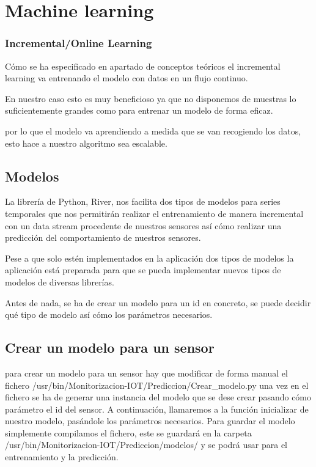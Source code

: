 \section{Machine learning}

\subsubsection{Incremental/Online Learning}

Cómo se ha especificado en apartado de conceptos teóricos el incremental learning va entrenando el modelo con datos en un flujo continuo. 

En nuestro caso esto es muy beneficioso ya que no disponemos de muestras lo suficientemente grandes como para entrenar un modelo de forma eficaz. 

por lo que el modelo va aprendiendo a medida que se van recogiendo los datos, esto hace a nuestro algoritmo sea escalable.

\subsection{Modelos}

La librería de Python, River, nos facilita dos tipos de modelos para series temporales que nos permitirán realizar el entrenamiento de manera incremental con un data stream procedente de nuestros sensores así cómo realizar una predicción del comportamiento de nuestros sensores.

Pese a que solo estén implementados en la aplicación dos tipos de modelos la aplicación está preparada para que se pueda implementar nuevos tipos de modelos de diversas librerías.

Antes de nada, se ha de crear un modelo para un id en concreto, se puede decidir qué tipo de modelo así cómo los parámetros necesarios.

\subsection{Crear un modelo para un sensor}

para crear un modelo para un sensor hay que modificar de forma manual el fichero /usr/bin/Monitorizacion-IOT/Prediccion/Crear\_modelo.py una vez en el fichero se ha de generar una instancia del modelo que se dese crear pasando cómo parámetro el id del sensor. A continuación, llamaremos a la función inicializar de nuestro modelo, pasándole los parámetros necesarios. Para guardar el modelo simplemente compilamos el fichero, este se guardará en la carpeta /usr/bin/Monitorizacion-IOT/Prediccion/modelos/ y se podrá usar para el entrenamiento y la predicción.

